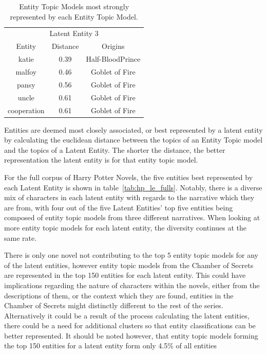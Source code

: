 \documentclass[10pt]{report}
\begin{document}
\begin{table}[h!]
{\begin{tabular}{c | c | c }
    \multicolumn{3}{c}{Latent Entity 3}\\
    Entity    & Distance & Origins\\
    \hline
    katie	    &0.39&	Half-BloodPrince\\
    malfoy	    &0.46&	Goblet of Fire  \\
    pansy	    &0.56&	Goblet of Fire  \\
    uncle	    &0.61&	Goblet of Fire  \\
    cooperation	&0.61&	Goblet of Fire
  \end{tabular}}
  \caption{Entity Topic Models most strongly represented by each Entity Topic Model.\label{tab:hp_le_summs}}
\end{table}
\renewcommand{\baselinestretch}{2.0}\normalsize
\renewcommand{\arraystretch}{1.0}

Entities are deemed most closely associated, or best represented by a latent entity by calculating the euclidean distance between the topics of an Entity Topic model and the topics of a Latent Entity. The shorter the distance, the better representation the latent entity is for that entity topic model.

For the full corpus of Harry Potter Novels, the five entities best represented by each Latent Entity is shown in table~\ref{tab:hp_le_fulls}. Notably, there is a diverse mix of characters in each latent entity with regards to the narrative which they are from, with four out of the five Latent Entities' top five entities being composed of entity topic models from three different narratives. When looking at more entity topic models for each latent entity, the diversity continues at the same rate.

There is only one novel not contributing to the top 5 entity topic models for any of the latent entities, however entity topic models from the Chamber of Secrets are represented in the top 150 entities for each latent entity. This could have implications regarding the nature of characters within the novels, either from the descriptions of them, or the context which they are found, entities in the Chamber of Secrets might distinctly different to the rest of the series. Alternatively it could be a result of the process calculating the latent entities, there could be a need for additional clusters so that entity classifications can be better represented. It should be noted however, that entity topic models forming the top 150 entities for a latent entity form only 4.5\% of all entities
\end{document}

